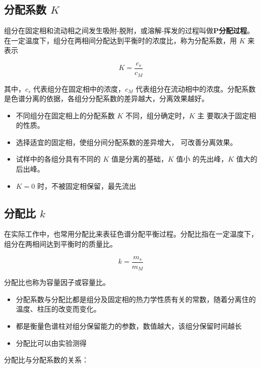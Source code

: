\subsection{分配系数 $K$}

组分在固定相和流动相之间发生吸附-脱附，或溶解-挥发的过程叫做\textbf{P分配过程}。
在一定温度下，组分在两相间分配达到平衡时的浓度比，称为分配系数，用 $K$ 来表示

\begin{equation} K = \frac{c_s}{c_M} \end{equation}

其中，$c_s$ 代表组分在固定相中的浓度，$c_M$ 代表组分在流动相中的浓度。分配系数
是色谱分离的依据，各组分分配系数的差异越大，分离效果越好。



\begin{itemize} \item 不同组分在固定相上的分配系数 $K$ 不同，组分确定时，$K$ 主
          要取决于固定相的性质。\item 选择适宜的固定相，使组分间分配系数的差异增大，
          可改善分离效果。\item 试样中的各组分具有不同的 $K$ 值是分离的基础，$K$ 值小
          的先出峰，$K$ 值大的后出峰。\item $K = 0$ 时，不被固定相保留，最先流出
\end{itemize}

\subsection{分配比 $k$}

在实际工作中，也常用分配比来表征色谱分配平衡过程。分配比指在一定温度下，组分在两相间达到平衡时的质量比。

\begin{equation}
    k = \frac{m_s}{m_M}
\end{equation}

分配比也称为容量因子或容量比。

\begin{itemize}
    \item 分配系数与分配比都是组分及固定相的热力学性质有关的常数，随着分离住的温度、柱压的改变而变化。
    \item 都是衡量色谱柱对组分保留能力的参数，数值越大，该组分保留时间越长
    \item 分配比可以由实验测得
\end{itemize}

分配比与分配系数的关系：

